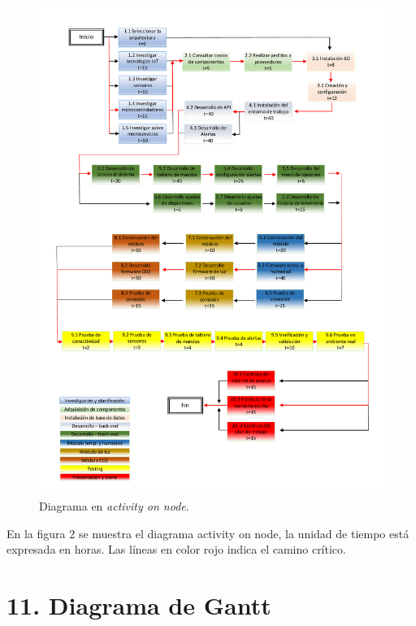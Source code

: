 \documentclass[
11pt, %
]{charter}
\begin{document}
\begin{figure}[htpb]
\centering 
\includegraphics[height=1.49\textwidth]{./Figuras/AoN.png}
\caption{Diagrama en \textit{activity on node}.}
\label{fig:AoN}
\end{figure}

En la figura 2 se muestra el diagrama activity on node, la unidad de tiempo está expresada en horas. Las líneas en color rojo indica el camino crítico.



\section{11. Diagrama de Gantt}
\label{sec:gantt}
\end{document}
